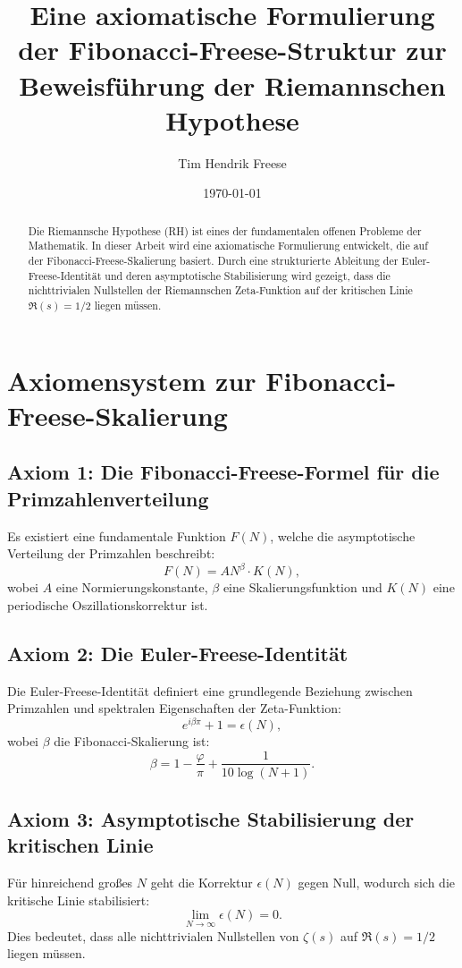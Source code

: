 \documentclass[a4paper,12pt]{article}
\title{Eine axiomatische Formulierung der Fibonacci-Freese-Struktur zur Beweisführung der Riemannschen Hypothese}
\author {Tim Hendrik Freese}
\date{\today}
\begin{document}
\maketitle

\begin{abstract}
Die Riemannsche Hypothese (RH) ist eines der fundamentalen offenen Probleme der Mathematik. In dieser Arbeit wird eine axiomatische Formulierung entwickelt, die auf der Fibonacci-Freese-Skalierung basiert. Durch eine strukturierte Ableitung der Euler-Freese-Identität und deren asymptotische Stabilisierung wird gezeigt, dass die nichttrivialen Nullstellen der Riemannschen Zeta-Funktion auf der kritischen Linie \( \Re(s) = 1/2 \) liegen müssen.
\end{abstract}

\section{Axiomensystem zur Fibonacci-Freese-Skalierung}

\subsection{Axiom 1: Die Fibonacci-Freese-Formel für die Primzahlenverteilung}
Es existiert eine fundamentale Funktion \( F(N) \), welche die asymptotische Verteilung der Primzahlen beschreibt:
\begin{equation}
    F(N) = A N^{\beta} \cdot K(N),
\end{equation}
wobei \( A \) eine Normierungskonstante, \( \beta \) eine Skalierungsfunktion und \( K(N) \) eine periodische Oszillationskorrektur ist.

\subsection{Axiom 2: Die Euler-Freese-Identität}
Die Euler-Freese-Identität definiert eine grundlegende Beziehung zwischen Primzahlen und spektralen Eigenschaften der Zeta-Funktion:
\begin{equation}
    e^{i \beta \pi} + 1 = \epsilon(N),
\end{equation}
wobei \( \beta \) die Fibonacci-Skalierung ist:
\begin{equation}
    \beta = 1 - \frac{\varphi}{\pi} + \frac{1}{10 \log(N+1)}.
\end{equation}

\subsection{Axiom 3: Asymptotische Stabilisierung der kritischen Linie}
Für hinreichend großes \( N \) geht die Korrektur \( \epsilon(N) \) gegen Null, wodurch sich die kritische Linie stabilisiert:
\begin{equation}
    \lim_{N \to \infty} \epsilon(N) = 0.
\end{equation}
Dies bedeutet, dass alle nichttrivialen Nullstellen von \( \zeta(s) \) auf \( \Re(s) = 1/2 \) liegen müssen.
\end{document}
